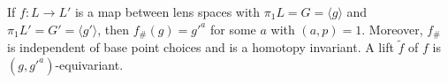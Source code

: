If $f: L \to L'$ is a map between lens spaces with $\pi_1 L = G = \langle g \rangle$ and $\pi_1 L' = G' = \langle g' \rangle$, then $f_\#(g) = g'^a$ for some $a$ with $(a, p) = 1$. Moreover, $f_\#$ is independent of base point choices and is a homotopy invariant. A lift $\tilde{f}$ of $f$ is $(g, g'^a)$-equivariant.
